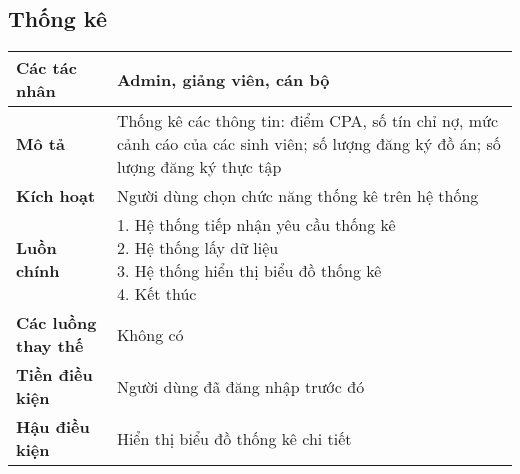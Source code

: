 \subsection*{Thống kê}
	\begin{tabular}{|l|p{}|}
		\hline
		\textbf{Các tác nhân}         & Admin, giảng viên, cán bộ                                                                                           \\
		\hline
		\textbf{Mô tả}                & Thống kê các thông tin: điểm CPA, số tín chỉ nợ, mức cảnh cáo của các sinh viên; số lượng đăng ký đồ án; số lượng đăng ký thực tập \\
		\hline
		\textbf{Kích hoạt}            & Người dùng chọn chức năng thống kê trên hệ thống                                                                                   \\
		\hline
		\textbf{Luồn chính}           & \makecell[l]{1. Hệ thống tiếp nhận yêu cầu thống kê                                                                                \\ 2. Hệ thống lấy dữ liệu \\ 3. Hệ thống hiển thị biểu đồ thống kê \\ 4. Kết thúc} \\
		\hline
		\textbf{Các luồng thay thế}   & Không có                                                                                                                           \\
		\hline
		\textbf{Tiền điều kiện}       & Người dùng đã đăng nhập trước đó                                                                                                   \\
		\hline
		\textbf{Hậu điều kiện}        & Hiển thị biểu đồ thống kê chi tiết                                                                                                 \\
		\hline
	\end{tabular}
